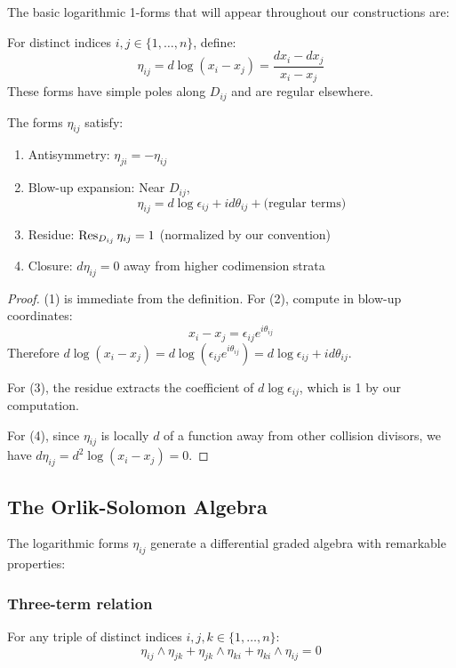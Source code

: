 The basic logarithmic 1-forms that will appear throughout our constructions are:
 
\begin{definition}
For distinct indices $i, j \in \{1, \ldots, n\}$, define:
\[
\eta_{ij} = d\log(x_i - x_j) = \frac{dx_i - dx_j}{x_i - x_j}
\]
These forms have simple poles along $D_{ij}$ and are regular elsewhere.
\end{definition}
 
\begin{proposition}\label{prop:eta}
The forms $\eta_{ij}$ satisfy:
\begin{enumerate}
\item Antisymmetry: $\eta_{ji} = -\eta_{ij}$
\item Blow-up expansion: Near $D_{ij}$,
\[
\eta_{ij} = d\log \epsilon_{ij} + id\theta_{ij} + \text{(regular terms)}
\]
\item Residue: $\operatorname{Res}_{D_{ij}} \eta_{ij} = 1$ (normalized by our convention)
\item Closure: $d\eta_{ij} = 0$ away from higher codimension strata
\end{enumerate}
\end{proposition}
 
\begin{proof}
(1) is immediate from the definition. For (2), compute in blow-up coordinates:
\[
x_i - x_j = \epsilon_{ij} e^{i\theta_{ij}}
\]
Therefore $d\log(x_i - x_j) = d\log(\epsilon_{ij} e^{i\theta_{ij}}) = d\log \epsilon_{ij} + id\theta_{ij}$.
 
For (3), the residue extracts the coefficient of $d\log \epsilon_{ij}$, which is 1 by our computation.
 
For (4), since $\eta_{ij}$ is locally $d$ of a function away from other collision divisors, we have $d\eta_{ij} = d^2\log(x_i - x_j) = 0$.
\end{proof}
 
\subsection{The Orlik-Solomon Algebra}
 
The logarithmic forms $\eta_{ij}$ generate a differential graded algebra with remarkable properties:

\subsubsection{Three-term relation}
\begin{theorem}
For any triple of distinct indices $i, j, k \in \{1,\ldots,n\}$:
$$\eta_{ij} \wedge \eta_{jk} + \eta_{jk} \wedge \eta_{ki} + \eta_{ki} \wedge \eta_{ij} = 0$$
\end{theorem}

